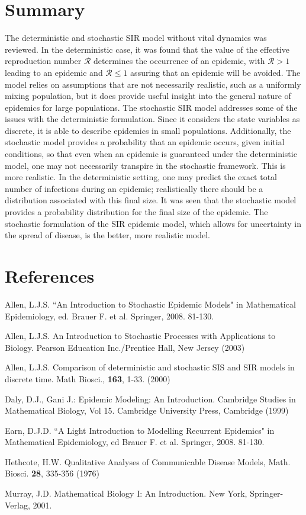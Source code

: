 \documentclass[reqno,11pt]{amsart}
\begin{document}
\section{Summary}
The deterministic and stochastic SIR model without vital dynamics was reviewed. In the deterministic case, it was found that the value of the effective reproduction number $\mathcal R$ determines the occurrence of an epidemic, with $\mathcal R > 1$ leading to an epidemic and $\mathcal R \le 1$ assuring that an epidemic will be avoided. The model relies on assumptions that are not necessarily realistic, such as a uniformly mixing population, but it does provide useful insight into the general nature of epidemics for large populations. The stochastic SIR model addresses some of the issues with the deterministic formulation. Since it considers the state variables as discrete, it is able to describe epidemics in small populations. Additionally, the stochastic model provides a probability that an epidemic occurs, given initial conditions, so that even when an epidemic is guaranteed under the deterministic model, one may not necessarily transpire in the stochastic framework. This is more realistic. In the deterministic setting, one may predict the exact total number of infections during an epidemic; realistically there should be a distribution associated with this final size. It was seen that the stochastic model provides a probability distribution for the final size of the epidemic. The stochastic formulation of the SIR epidemic model, which allows for uncertainty in the spread of disease, is the better, more realistic model.

\newpage
%
%
%
%
\section{References}

Allen, L.J.S. ``An Introduction to Stochastic Epidemic Models" in Mathematical Epidemiology, ed. Brauer F. et al. Springer, 2008. 81-130.

Allen, L.J.S. An Introduction to Stochastic Processes with Applications to Biology. Pearson Education Inc./Prentice Hall, New Jersey (2003)

Allen, L.J.S. Comparison of deterministic and stochastic SIS and SIR models in discrete time. Math Biosci., {\bf 163}, 1-33. (2000)

Daly, D.J., Gani J.: Epidemic Modeling: An Introduction. Cambridge Studies in Mathematical Biology, Vol 15. Cambridge University Press, Cambridge (1999)

Earn, D.J.D. ``A Light Introduction to Modelling Recurrent Epidemics" in Mathematical Epidemiology, ed Brauer F. et al. Springer, 2008. 81-130.

Hethcote, H.W. Qualitative Analyses of Communicable Disease Models, Math. Biosci. {\bf 28}, 335-356 (1976)

Murray, J.D. Mathematical Biology I: An Introduction. New York, Springer-Verlag, 2001.
%
%
%
%
\end{document}
